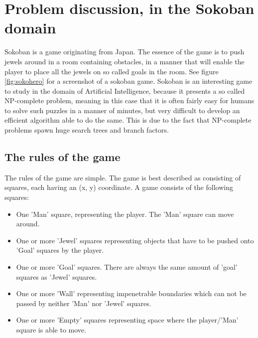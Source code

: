 \section{Problem discussion, in the Sokoban domain}
Sokoban is a game originating from Japan. The essence of the game is to push jewels around in a room containing obstacles, in a manner that will enable the player to place all the jewels on so called goals in the room. See figure \ref{fig:sokohero} for a screenshot of a sokoban game.
Sokoban is an interesting game to study in the domain of Artificial Intelligence, because it presents a so called NP-complete problem, meaning in this case that it is often fairly easy for humans to solve such puzzles in a manner of minutes, but very difficult to develop an efficient algorithm able to do the same. This is due to the fact that NP-complete problems spawn huge search trees and branch factors.

\subsection{The rules of the game}
The rules of the game are simple. The game is best described as consisting of squares, each having an (x, y) coordinate. A game consists of the following squares:
\begin{itemize}
\item One 'Man' square, representing the player. The 'Man' square can move around.
\item One or more 'Jewel' squares representing objects that have to be pushed onto 'Goal' squares by the player.
\item One or more 'Goal' squares. There are always the same amount of 'goal' squares as 'Jewel' squares.
\item One or more 'Wall' representing impenetrable boundaries which can not be passed by neither 'Man' nor 'Jewel' squares.
\item One or more 'Empty' squares representing space where the player/'Man' square is able to move. 
\end{itemize}

